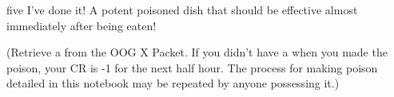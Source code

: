 \documentclass[notebook]{Silversiders} %
\begin{document}
\begin{page}{five}
I've done it! A potent poisoned dish that should be effective almost immediately after being eaten!

(Retrieve a \iPoisonedVeal{} from the OOG X Packet. If you didn't have a \iFaceMask{} when you made the poison, your CR is -1 for the next half hour. The process for making poison detailed in this notebook may be repeated by anyone possessing it.)
\end{page}

\endnotebook
\end{document}
